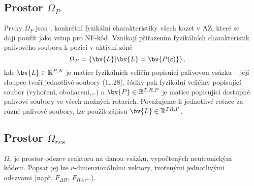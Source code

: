 \subsection{Prostor $\Omega_{P}$}
Prvky $\Omega_P$ jsou , konkrétní fyzikální charakteristiky všech kazet v AZ, které se dají použít jako vstup pro NF-kód. Vznikají 
přiřazením fyzikálních charakteristik palivového souboru k pozici v aktivní zóně
\begin{equation}
	\Omega_P = \{\bv{L}|\bv{L} = \bv{P(c)}\}\,,
\end{equation}
kde $\bv{L}\in\mathbb{R}^{P,N}$ je matice fyzikálních veličin popisuící palivovou vsázku -- její sloupce tvoří jednotlivé soubory (1\dots 28), 
řádky pak fyzikální veličiny popisující soubor (vyhoření, obohacení,\dots) a $\bv{P}\in\mathbb{R}^{T,R,P}$ je matice popisující dostupné palivové 
soubory ve všech možných rotacích. Považujeme-li jednotlivé rotace za různé palivové soubory, lze použít zápisu $\bv{L}\in\mathbb{R}^{TR,P}$.

\subsection{Prostor $\Omega_{res}$}
$\Omega_r$ je prostor odezev reaktoru na danou vsázku, vypočtených neutronickým kódem. Popsat jej lze $v$-dimenzionálními vektory, tvořenými jednotlivými 
odezvami (např. $F_{\Delta H}$, $F_{HA}$,\dots).



